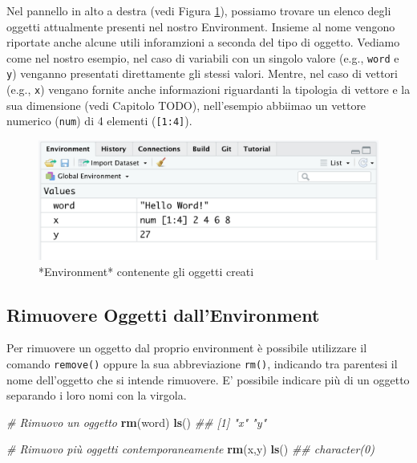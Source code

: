 \documentclass[
]{book}
\newenvironment{Shaded}{\begin{snugshade}}{\end{snugshade}}
\newcommand{\CommentTok}[1]{\textcolor[rgb]{0.56,0.35,0.01}{\textit{#1}}}
\newcommand{\KeywordTok}[1]{\textcolor[rgb]{0.13,0.29,0.53}{\textbf{#1}}}
\newcommand{\NormalTok}[1]{#1}
\begin{document}
Nel pannello in alto a destra (vedi Figura \ref{fig:environment-object}), possiamo trovare un elenco degli oggetti attualmente presenti nel nostro Environment. Insieme al nome vengono riportate anche alcune utili inforamzioni a seconda del tipo di oggetto. Vediamo come nel nostro esempio, nel caso di variabili con un singolo valore (e.g., \texttt{word} e \texttt{y}) venganno presentati direttamente gli stessi valori. Mentre, nel caso di vettori (e.g., \texttt{x}) vengano fornite anche informazioni riguardanti la tipologia di vettore e la sua dimensione (vedi Capitolo TODO), nell'esempio abbiimao un vettore numerico (\texttt{num}) di 4 elementi (\texttt{{[}1:4{]}}).

\begin{figure}

{\centering \includegraphics[width=0.6\linewidth]{images/environment-objects} 

}

\caption{*Environment* contenente gli oggetti creati}\label{fig:environment-object}
\end{figure}

\hypertarget{rimuovere-oggetti-dallenvironment}{%
\subsection{Rimuovere Oggetti dall'Environment}\label{rimuovere-oggetti-dallenvironment}}

Per rimuovere un oggetto dal proprio environment è possibile utilizzare il comando \texttt{remove()} oppure la sua abbreviazione \texttt{rm()}, indicando tra parentesi il nome dell'oggetto che si intende rimuovere. E' possibile indicare più di un oggetto separando i loro nomi con la virgola.

\begin{Shaded}
\begin{Highlighting}[]
\CommentTok{# Rimuovo un oggetto}
\KeywordTok{rm}\NormalTok{(word)}
\KeywordTok{ls}\NormalTok{()}
\CommentTok{## [1] "x" "y"}

\CommentTok{# Rimuovo più oggetti contemporaneamente}
\KeywordTok{rm}\NormalTok{(x,y)}
\KeywordTok{ls}\NormalTok{()}
\CommentTok{## character(0)}
\end{Highlighting}
\end{Shaded}
\end{document}
